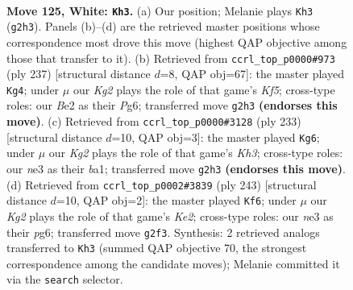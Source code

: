 \documentclass[11pt]{article}
\begin{document}
\clearpage

\begin{figure}[p]\centering
\begin{subfigure}{0.46\textwidth}\centering
\resizebox{\linewidth}{!}{%
\newchessgame
\chessboard[
  setfen={8/8/7k/6p1/8/4n3/4B1K1/8 w - - 7 125},
  showmover=false,
  pgfstyle=straightmove, color=movearrow, markmove={g2-h3}
]}
\caption{}
\end{subfigure}\hfill
\begin{subfigure}{0.46\textwidth}\centering
\resizebox{\linewidth}{!}{%
\newchessgame
\chessboard[
  setfen={8/8/6p1/r7/5k2/8/4NPK1/8 b - - 63 119},
  showmover=false,
  pgfstyle=straightmove, color=movearrow, markmove={f4-g4}
]}
\caption{}
\end{subfigure}
\\[4pt]
\begin{subfigure}{0.46\textwidth}\centering
\resizebox{\linewidth}{!}{%
\newchessgame
\chessboard[
  setfen={8/8/2b1p2k/8/5P2/6K1/8/B7 b - - 0 117},
  showmover=false,
  pgfstyle=straightmove, color=movearrow, markmove={h6-g6}
]}
\caption{}
\end{subfigure}\hfill
\begin{subfigure}{0.46\textwidth}\centering
\resizebox{\linewidth}{!}{%
\newchessgame
\chessboard[
  setfen={8/4k1b1/6P1/3P4/4K1B1/8/8/8 b - - 4 122},
  showmover=false,
  pgfstyle=straightmove, color=movearrow, markmove={e7-f6}
]}
\caption{}
\end{subfigure}
\caption{\textbf{Move 125, White: \texttt{Kh3}.} (a) Our position; Melanie plays \texttt{Kh3} (\texttt{g2h3}). Panels (b)--(d) are the retrieved master positions whose correspondence most drove this move (highest QAP objective among those that transfer to it). (b) Retrieved from \texttt{ccrl\_top\_p0000\#973} (ply 237) [structural distance $d$=8, QAP obj=67]: the master played \texttt{Kg4}; under $\mu$ our \emph{Kg2} plays the role of that game's \emph{Kf5}; cross-type roles: our \emph{B}e2 as their \emph{P}g6; transferred move \texttt{g2h3} \textbf{(endorses this move)}. (c) Retrieved from \texttt{ccrl\_top\_p0000\#3128} (ply 233) [structural distance $d$=10, QAP obj=3]: the master played \texttt{Kg6}; under $\mu$ our \emph{Kg2} plays the role of that game's \emph{Kh3}; cross-type roles: our \emph{n}e3 as their \emph{b}a1; transferred move \texttt{g2h3} \textbf{(endorses this move)}. (d) Retrieved from \texttt{ccrl\_top\_p0002\#3839} (ply 243) [structural distance $d$=10, QAP obj=2]: the master played \texttt{Kf6}; under $\mu$ our \emph{Kg2} plays the role of that game's \emph{Ke2}; cross-type roles: our \emph{n}e3 as their \emph{p}g6; transferred move \texttt{g2f3}. Synthesis: 2 retrieved analogs transferred to \texttt{Kh3} (summed QAP objective 70, the strongest correspondence among the candidate moves); Melanie committed it via the \texttt{search} selector.}
\label{fig:thought-m248}
\end{figure}
\end{document}
